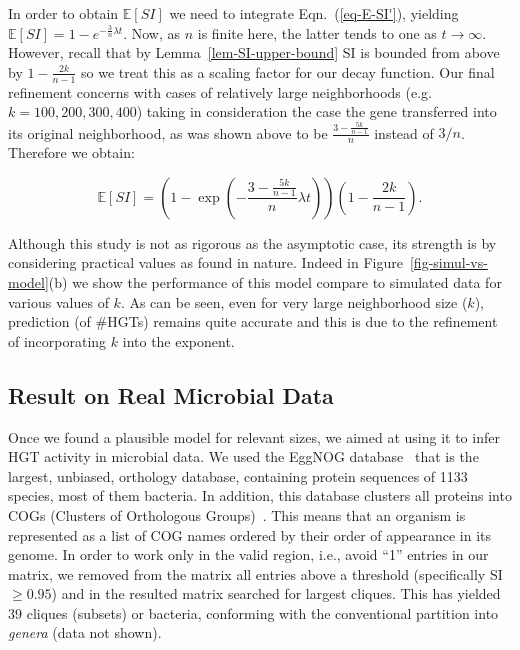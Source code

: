 \documentclass[runningheads, 11pt]{llncs}
\newcommand{\EE}{\mathbb{E}}
\begin{document}
In order to obtain $\EE[SI]$ we need to integrate Eqn.~(\ref{eq-E-SI'}), yielding
$\EE[SI]=1 - e^{-\frac {3}{n}\lambda t}$. Now, as $n$ is finite here, the latter
tends to one as $t\rightarrow\infty$. However, recall that by
Lemma~\ref{lem-SI-upper-bound} SI is bounded from above by $1-\frac {2k}{n-1}$
so we treat this as a scaling factor for our decay function. Our final
refinement concerns with cases of relatively large neighborhoods (e.g. $k=100,
200, 300, 400$) taking in consideration the case the gene transferred into its
original neighborhood, as was shown above to be $\frac {3-\frac {5k}{n-1}}{n}$
instead of $3/n$. Therefore we obtain:

\begin{equation}
\label{eq-final-SI-simul}
\EE[SI]=\left (1-\exp\left (-\frac {3-\frac
 {5k}{n-1}}{n}\lambda t\right ) \right )\left (1-\frac{2k}{n-1} \right ).
\end{equation}

Although this study is not as rigorous as the asymptotic case, its strength is
by considering practical values as found in nature. Indeed in
Figure~\ref{fig-simul-vs-model}(b) we show the performance of this model compare
to simulated data for various values of $k$. As can be seen, even for very large
neighborhood size ($k$), prediction (of \#HGTs) remains quite accurate and this
is due to the refinement of incorporating $k$ into the exponent.



\subsection{Result on Real Microbial Data}
Once we found a plausible model for relevant sizes, we aimed at using it to
infer HGT activity in microbial data. We used the EggNOG
database~\cite{Powell12} that is the largest, unbiased, orthology database,
containing protein sequences of 1133 species, most of them bacteria. In
addition, this database clusters all proteins into COGs (Clusters of Orthologous
Groups)~\cite{Tatusov-COGS}. This means that an organism is represented as a
list of COG names ordered by their order of appearance in its genome. In order
to work only in the valid region, i.e.,  avoid ``1'' entries in our matrix, we
removed from the matrix all entries above a threshold (specifically SI $\ge
0.95$) and in the resulted matrix searched for largest cliques. This has yielded
39 cliques (subsets) or bacteria, conforming with the conventional partition
into {\em genera} (data not shown).
\end{document}
